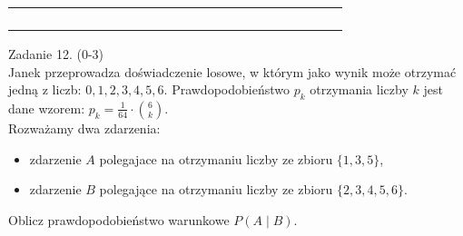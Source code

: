 \documentclass[10pt]{article}
\begin{document}
\begin{center}
\begin{tabular}{|c|c|c|c|c|c|c|c|c|c|c|c|c|c|c|c|c|c|c|c|c|c|c|}
\hline
 &  &  &  &  &  &  &  &  &  &  &  &  &  &  &  &  &  &  &  &  &  &  \\
\hline
 &  &  &  &  &  &  &  &  &  &  &  &  &  &  &  &  &  &  &  &  &  &  \\
\hline
 &  &  &  &  &  &  &  &  &  &  &  &  &  &  &  &  &  &  &  &  &  &  \\
\hline
 &  &  &  &  &  &  &  &  &  &  &  &  &  &  &  &  &  &  &  &  &  &  \\
\hline
 &  &  &  &  &  &  &  &  &  &  &  &  &  &  &  &  &  &  &  &  &  &  \\
\hline
\end{tabular}
\end{center}

Zadanie 12. (0-3)\\
Janek przeprowadza doświadczenie losowe, w którym jako wynik może otrzymać jedną z liczb: \(0,1,2,3,4,5,6\). Prawdopodobieństwo \(p_{k}\) otrzymania liczby \(k\) jest dane wzorem: \(p_{k}=\frac{1}{64} \cdot\binom{6}{k}\).\\
Rozważamy dwa zdarzenia:

\begin{itemize}
  \item zdarzenie \(A\) polegajace na otrzymaniu liczby ze zbioru \(\{1,3,5\}\),
  \item zdarzenie \(B\) polegające na otrzymaniu liczby ze zbioru \(\{2,3,4,5,6\}\).
\end{itemize}

Oblicz prawdopodobieństwo warunkowe \(P(A \mid B)\).
\end{document}
